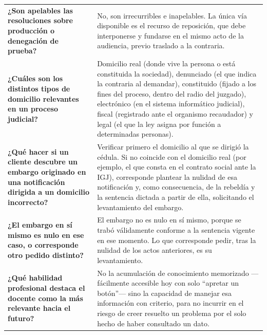 \documentclass[12pt,oneside]{book}
\begin{document}
\begin{longtable}{
    >{\raggedright\arraybackslash}p{}
    >{\raggedright\arraybackslash}p{}
}
\textbf{¿Son apelables las resoluciones sobre producción o denegación de prueba?} &
No, son irrecurribles e inapelables. La única vía disponible es el recurso de reposición, que debe interponerse y fundarse en el mismo acto de la audiencia, previo traslado a la contraria. \\
\addlinespace[0.5em]

\textbf{¿Cuáles son los distintos tipos de domicilio relevantes en un proceso judicial?} &
Domicilio real (donde vive la persona o está constituida la sociedad), denunciado (el que indica la contraria al demandar), constituido (fijado a los fines del proceso, dentro del radio del juzgado), electrónico (en el sistema informático judicial), fiscal (registrado ante el organismo recaudador) y legal (el que la ley asigna por función a determinadas personas). \\
\addlinespace[0.5em]

\textbf{¿Qué hacer si un cliente descubre un embargo originado en una notificación dirigida a un domicilio incorrecto?} &
Verificar primero el domicilio al que se dirigió la cédula. Si no coincide con el domicilio real (por ejemplo, el que consta en el contrato social ante la IGJ), corresponde plantear la nulidad de esa notificación y, como consecuencia, de la rebeldía y la sentencia dictada a partir de ella, solicitando el levantamiento del embargo. \\
\addlinespace[0.5em]

\textbf{¿El embargo en sí mismo es nulo en ese caso, o corresponde otro pedido distinto?} &
El embargo no es nulo en sí mismo, porque se trabó válidamente conforme a la sentencia vigente en ese momento. Lo que corresponde pedir, tras la nulidad de los actos anteriores, es su levantamiento. \\
\addlinespace[0.5em]

\textbf{¿Qué habilidad profesional destaca el docente como la más relevante hacia el futuro?} &
No la acumulación de conocimiento memorizado ---fácilmente accesible hoy con solo ``apretar un botón''--- sino la capacidad de manejar esa información con criterio, para no incurrir en el riesgo de creer resuelto un problema por el solo hecho de haber consultado un dato. \\


\end{longtable}
\end{document}
